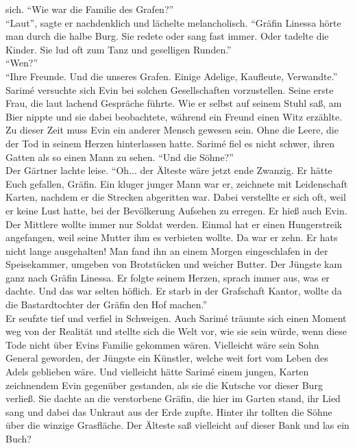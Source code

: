 sich. ``Wie war die Familie des Grafen?''\\
``Laut'', sagte er nachdenklich und lächelte melancholisch. ``Gräfin Linessa hörte man durch die 
halbe Burg. Sie redete oder sang fast immer. Oder tadelte die Kinder. Sie lud oft zum Tanz und 
geselligen Runden.''\\
``Wen?''\\
``Ihre Freunde. Und die unseres Grafen. Einige Adelige, Kaufleute, Verwandte.''\\
Sarimé versuchte sich Evin bei solchen Gesellschaften vorzustellen. Seine erste Frau, die laut 
lachend Gespräche führte. Wie er selbst auf seinem Stuhl saß, am Bier nippte und sie dabei 
beobachtete, während ein Freund einen Witz erzählte. Zu dieser Zeit muss Evin ein anderer Mensch 
gewesen sein. Ohne die Leere, die der Tod in seinem Herzen hinterlassen hatte. Sarimé fiel es nicht 
schwer, ihren Gatten als so einen Mann zu sehen. ``Und die Söhne?''\\
Der Gärtner lachte leise. ``Oh... der Älteste wäre jetzt ende Zwanzig. Er hätte Euch gefallen, 
Gräfin. Ein kluger junger Mann war er, zeichnete mit Leidenschaft Karten, nachdem er die Strecken 
abgeritten war. Dabei verstellte er sich oft, weil er keine Lust hatte, bei der Bevölkerung 
Aufsehen zu erregen. Er hieß auch Evin. Der Mittlere wollte immer nur Soldat werden. Einmal hat er 
einen Hungerstreik angefangen, weil seine Mutter ihm es verbieten wollte. Da war er zehn. Er hats 
nicht lange ausgehalten! Man fand ihn an einem Morgen eingeschlafen in der Speisekammer, umgeben 
von Brotstücken und weicher Butter. Der Jüngste kam ganz nach Gräfin Linessa. Er folgte seinem 
Herzen, sprach immer aus, was er dachte. Und das war selten höflich. Er starb in der Grafschaft 
Kantor, wollte da die Bastardtochter der Gräfin den Hof machen.''\\
Er seufzte tief und verfiel in Schweigen. Auch Sarimé träumte sich einen Moment weg von der 
Realität und stellte sich die Welt vor, wie sie sein würde, wenn diese Tode nicht über Evins 
Familie gekommen wären. Vielleicht wäre sein Sohn General geworden, der Jüngste ein Künstler, 
welche weit fort vom Leben des Adels geblieben wäre. Und vielleicht hätte Sarimé einem jungen, 
Karten zeichnendem Evin gegenüber gestanden, als sie die Kutsche vor dieser Burg verließ. Sie 
dachte an die verstorbene Gräfin, die hier im Garten stand, ihr Lied sang und dabei das Unkraut aus 
der Erde zupfte. Hinter ihr tollten die Söhne über die winzige Grasfläche. Der Älteste saß 
vielleicht auf dieser Bank und las ein Buch?\\
